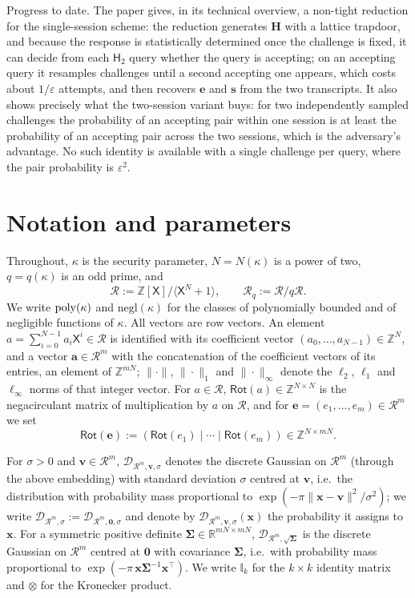 \documentclass{aicr-conjecture}
\newcommand{\ZZ}{\mathbb{Z}}
\newcommand{\RR}{\mathbb{R}}
\newcommand{\II}{\mathbb{I}}
\newcommand{\cR}{\mathcal{R}}
\newcommand{\cD}{\mathcal{D}}
\newcommand{\negl}{\mathrm{negl}}
\newcommand{\Rot}{\mathsf{Rot}}
\newcommand{\Htwo}{\mathsf{H}_2}
\begin{document}
Progress to date. The paper gives, in its technical overview, a
non-tight reduction for the single-session scheme: the reduction
generates $\mathbf{H}$ with a lattice trapdoor, and because the
response is statistically determined once the challenge is fixed, it
can decide from each $\Htwo$ query whether the query is accepting; on
an accepting query it resamples challenges until a second accepting one
appears, which costs about $1/\varepsilon$ attempts, and then recovers
$\mathbf{e}$ and $\mathbf{s}$ from the two transcripts. It also shows
precisely what the two-session variant buys: for two independently
sampled challenges the probability of an accepting pair within one
session is at least the probability of an accepting pair across the two
sessions, which is the adversary's advantage. No such identity is
available with a single challenge per query, where the pair probability
is $\varepsilon^2$.

\section{Notation and parameters}\label{sec:notation}

Throughout, $\kappa$ is the security parameter, $N = N(\kappa)$ is a
power of two, $q = q(\kappa)$ is an odd prime, and
\[
  \cR := \ZZ[\mathsf{X}]/\langle \mathsf{X}^N + 1\rangle,
  \qquad \cR_q := \cR/q\cR.
\]
We write $\mathrm{poly}(\kappa)$ and $\negl(\kappa)$ for the classes of
polynomially bounded and of negligible functions of $\kappa$. All
vectors are row vectors. An element
$a = \sum_{i=0}^{N-1} a_i \mathsf{X}^i \in \cR$ is identified with its
coefficient vector $(a_0,\dots,a_{N-1}) \in \ZZ^N$, and a vector
$\mathbf{a} \in \cR^m$ with the concatenation of the coefficient
vectors of its entries, an element of $\ZZ^{mN}$; $\|\cdot\|$,
$\|\cdot\|_1$ and $\|\cdot\|_\infty$ denote the $\ell_2$, $\ell_1$ and
$\ell_\infty$ norms of that integer vector. For $a \in \cR$,
$\Rot(a) \in \ZZ^{N\times N}$ is the negacirculant matrix of
multiplication by $a$ on $\cR$, and for
$\mathbf{e} = (e_1,\dots,e_m) \in \cR^m$ we set
\[
  \Rot(\mathbf{e}) := (\Rot(e_1) \mid \cdots \mid \Rot(e_m))
    \in \ZZ^{N \times mN}.
\]

For $\sigma > 0$ and $\mathbf{v} \in \cR^m$,
$\cD_{\cR^m,\mathbf{v},\sigma}$ denotes the discrete Gaussian on
$\cR^m$ (through the above embedding) with standard deviation $\sigma$
centred at $\mathbf{v}$, i.e.\ the distribution with probability mass
proportional to $\exp(-\pi\|\mathbf{x}-\mathbf{v}\|^2/\sigma^2)$; we
write $\cD_{\cR^m,\sigma} := \cD_{\cR^m,\mathbf{0},\sigma}$ and denote
by $\cD_{\cR^m,\mathbf{v},\sigma}(\mathbf{x})$ the probability it
assigns to $\mathbf{x}$. For a symmetric positive definite
$\boldsymbol\Sigma \in \RR^{mN\times mN}$,
$\cD_{\cR^m,\sqrt{\boldsymbol\Sigma}}$ is the discrete Gaussian on
$\cR^m$ centred at $\mathbf{0}$ with covariance $\boldsymbol\Sigma$,
i.e.\ with probability mass proportional to
$\exp(-\pi\,\mathbf{x}\boldsymbol\Sigma^{-1}\mathbf{x}^\top)$. We write
$\II_k$ for the $k\times k$ identity matrix and $\otimes$ for the
Kronecker product.
\end{document}

